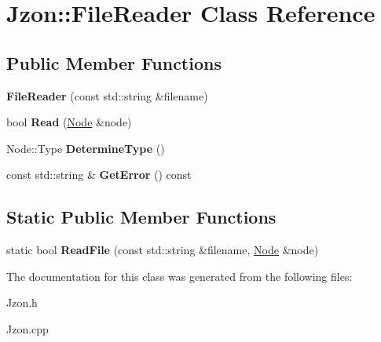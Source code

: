 \hypertarget{class_jzon_1_1_file_reader}{\section{Jzon\-:\-:File\-Reader Class Reference}
\label{class_jzon_1_1_file_reader}
}
\subsection*{Public Member Functions}
\begin{DoxyCompactItemize}
\item 
\hypertarget{class_jzon_1_1_file_reader_ad4d33b242596a91b06fdaedad8d1d347}{{\bfseries File\-Reader} (const std\-::string \&filename)}\label{class_jzon_1_1_file_reader_ad4d33b242596a91b06fdaedad8d1d347}

\item 
\hypertarget{class_jzon_1_1_file_reader_a166b5e7c68b6cd266e00980722b09885}{bool {\bfseries Read} (\hyperlink{class_jzon_1_1_node}{Node} \&node)}\label{class_jzon_1_1_file_reader_a166b5e7c68b6cd266e00980722b09885}

\item 
\hypertarget{class_jzon_1_1_file_reader_a7d2ffe10597d02fbbae2f258b05e0d79}{Node\-::\-Type {\bfseries Determine\-Type} ()}\label{class_jzon_1_1_file_reader_a7d2ffe10597d02fbbae2f258b05e0d79}

\item 
\hypertarget{class_jzon_1_1_file_reader_a1dae7fa03e20b1e4a0a0e0a306014463}{const std\-::string \& {\bfseries Get\-Error} () const }\label{class_jzon_1_1_file_reader_a1dae7fa03e20b1e4a0a0e0a306014463}

\end{DoxyCompactItemize}
\subsection*{Static Public Member Functions}
\begin{DoxyCompactItemize}
\item 
\hypertarget{class_jzon_1_1_file_reader_a8e6840bf7ade1a57f1a846c21a4c7962}{static bool {\bfseries Read\-File} (const std\-::string \&filename, \hyperlink{class_jzon_1_1_node}{Node} \&node)}\label{class_jzon_1_1_file_reader_a8e6840bf7ade1a57f1a846c21a4c7962}

\end{DoxyCompactItemize}


The documentation for this class was generated from the following files\-:\begin{DoxyCompactItemize}
\item 
Jzon.\-h\item 
Jzon.\-cpp\end{DoxyCompactItemize}
